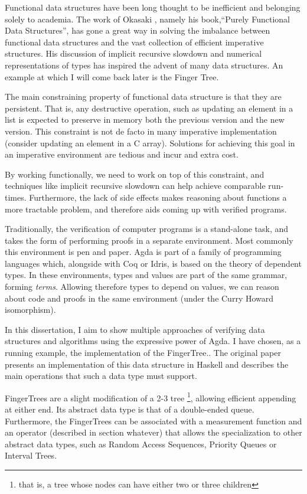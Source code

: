 \documentclass[12pt,twoside,notitlepage]{report}
\begin{document}
Functional data structures have been long thought to be inefficient and belonging solely to academia. The work of Okasaki \cite{okasaki}, namely his book,“Purely Functional Data Structures”, has gone a great way in solving the imbalance between functional data structures and the vast collection of efficient imperative structures. His discussion of implicit recursive slowdown and numerical representations of types has inspired the advent of many data structures. An example at which I will come back later is the Finger Tree.

The main constraining property of functional data structure is that they are persistent. That is, any destructive operation, such as updating an element in a list is expected to preserve in memory both the previous version and the new version. This constraint is not de facto in many imperative implementation (consider updating an element in a C array). Solutions for achieving this goal in an imperative environment are tedious and incur and extra cost. 

By working functionally, we need to work on top of this constraint, and techniques like implicit recursive slowdown can help achieve comparable run-times. Furthermore, the lack of side effects makes reasoning about functions a more tractable problem, and therefore aids coming up with verified programs.

Traditionally, the verification of computer programs is a stand-alone task, and takes the form of performing proofs in a separate environment. Most commonly this environment is pen and paper. Agda is part of a family of programming languages which, alongside with Coq or Idris, is based on the theory of dependent types. In these environments, types and values are part of the same grammar, forming \textit{terms}. Allowing therefore types to depend on values, we can reason about code and proofs in the same environment (under the Curry Howard isomorphism).  

In this dissertation, I aim to show multiple approaches of verifying data structures and algorithms using the expressive power of Agda. I have chosen, as a running example, the implementation of the FingerTree.\cite{fingertree}. The original paper presents an implementation of this data structure in Haskell and describes the main operations that such a data type must support. 

FingerTrees are a slight modification of a 2-3 tree \footnote{that is, a tree whose nodes can have either two or three children}, allowing efficient appending at either end. Its abstract data type is that of a double-ended queue. Furthermore, the FingerTrees can be associated with a measurement function and an operator (described in section whatever) that allows the specialization to other abstract data types, such as Random Access Sequences, Priority Queues or Interval Trees.
\end{document}
